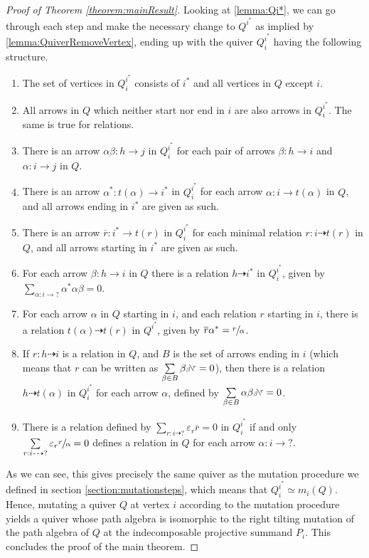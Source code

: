 \documentclass[12pt, dvipsnames, oneside]{amsart}
\theoremstyle{definition}
\newcommand{\bsfrac}[2]{\reflectbox{\sfrac{\text{\reflectbox{$#1$}}}{\text{\reflectbox{$#2$}}}}}
\begin{document}
\begin{proof}[Proof of Theorem \ref{theorem:mainResult}]
Looking at \cref{lemma:Qi*}, we can go through each step and make the necessary change to $Q^{i^*}$ as implied by \cref{lemma:QuiverRemoveVertex}, ending up with the quiver $Q_i^{i^*}$ having the following structure.
\begin{enumerate}\addtocounter{enumi}{-1}
\item The set of vertices in $Q^{i^*}_i$ consists of $i^*$ and all vertices in $Q$ except $i$.
\item All arrows in $Q$ which neither start nor end in $i$ are also arrows in $Q_i^{i^*}$. The same is true for relations.
\item There is an arrow $\alpha\beta\colon h\rightarrow j$ in $Q_i^{i^*}$ for each pair of arrows $\beta\colon h \rightarrow i$ and $\alpha\colon i \rightarrow j$ in $Q$.
\item There is an arrow $\alpha^*\colon t(\alpha)\rightarrow i^*$ in $Q_i^{i^*}$ for each arrow $\alpha\colon i\rightarrow t(\alpha)$ in $Q$, and all arrows ending in $i^*$ are given as such. 
\item There is an arrow $\overline{r}\colon i^*\rightarrow t(r)$ in $Q_i^{i^*}$ for each minimal relation $r\colon i \dashrightarrow t(r)$ in $Q$, and all arrows starting in $i^*$ are given as such.
\item For each arrow $\beta\colon h\rightarrow i$ in $Q$ there is a relation $h\dashrightarrow i^*$ in $Q_i^{i^*}$, given by $\sum\limits_{\alpha:i\rightarrow ?}\alpha^*\alpha\beta=0$. 
\item For each arrow $\alpha$ in $Q$ starting in $i$, and each relation $r$ starting in $i$, there is a relation $t(\alpha)\dashrightarrow t(r)$ in $Q^{i^*}$, given by $\overline{r}\alpha^*=\sfrac{r}{\alpha}$.
\item If $r\colon h\dashrightarrow i$ is a relation in $Q$, and $B$ is the set of arrows ending in $i$ (which means that $r$ can be written as $\sum\limits_{\beta\in B} \beta \bsfrac{r}{\beta}=0$), then there is a relation $h\dashrightarrow t(\alpha)$ in $Q_i^{i^*}$ for each arrow $\alpha$, defined by $\sum\limits_{\beta\in B} \alpha\beta \bsfrac{r}{\beta}=0$.
\item There is a relation defined by $\sum\limits_{r:i\dashrightarrow ?} \varepsilon_r \overline{r}=0$ in $Q_i^{i^*}$ if and only $\sum\limits_{r:i\dashrightarrow ?} \varepsilon_r \sfrac{r}{\alpha}=0$ defines a relation in $Q$ for each arrow $\alpha\colon i\rightarrow ?$.
\end{enumerate}

As we can see, this gives precisely the same quiver as the mutation procedure we defined in section \cref{section:mutationsteps}, which means that $Q_i^{i^*}\simeq m_i(Q)$. Hence, mutating a quiver $Q$ at vertex $i$ according to the mutation procedure yields a quiver whose path algebra is isomorphic to the right tilting mutation of the path algebra of $Q$ at the indecomposable projective summand $P_i$. This concludes the proof of the main theorem.

\end{proof}
\end{document}
